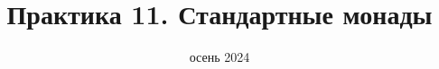 
\newif\ifhandout




\title[11. Стандартные монады]{Практика 11. Стандартные монады}
\date{осень 2024}



    \setcounter{framenumber}{-1}
    \maketitle


